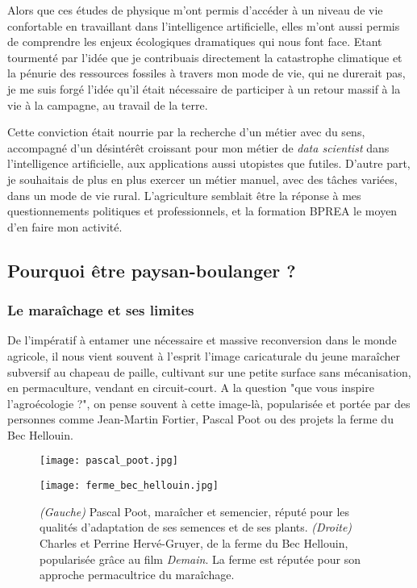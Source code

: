 \documentclass{book}
\begin{document}
Alors que ces études de physique m'ont permis d'accéder à un niveau de vie confortable en travaillant dans l'intelligence artificielle, elles m'ont aussi permis de comprendre les enjeux écologiques dramatiques qui nous font face. Etant tourmenté par l'idée que je contribuais directement la catastrophe climatique et la pénurie des ressources fossiles à travers mon mode de vie, qui ne durerait pas, je me suis forgé l'idée qu'il était nécessaire de participer à un retour massif à la vie à la campagne, au travail de la terre. 

Cette conviction était nourrie par la recherche d'un métier avec du sens, accompagné d'un désintérêt croissant pour mon métier de \textit{data scientist} dans l'intelligence artificielle, aux applications aussi utopistes que futiles. D'autre part, je souhaitais de plus en plus exercer un métier manuel, avec des tâches variées, dans un mode de vie rural. L'agriculture semblait être la réponse à mes questionnements politiques et professionnels, et la formation BPREA le moyen d'en faire mon activité.

\subsection{Pourquoi être paysan-boulanger ?}

\subsubsection{Le maraîchage et ses limites}

De l'impératif à entamer une nécessaire et massive reconversion dans le monde agricole, il nous vient souvent à l'esprit l'image caricaturale du jeune maraîcher subversif au chapeau de paille, cultivant sur une petite surface sans mécanisation, en permaculture, vendant en circuit-court. A la question "que vous inspire l'agroécologie ?", on pense souvent à cette image-là, popularisée et portée par des personnes comme Jean-Martin Fortier, Pascal Poot ou des projets la ferme du Bec Hellouin. 

\begin{figure}[h!]
\centering
\begin{minipage}{.5\textwidth}
  \centering
  \texttt{[image: pascal\_poot.jpg]}
  \label{fig:test1}
\end{minipage}%
\begin{minipage}{.5\textwidth}
  \centering
  \texttt{[image: ferme\_bec\_hellouin.jpg]}
  \label{fig:test2}
\end{minipage}
\caption{\textit{(Gauche)} Pascal Poot, maraîcher et semencier, réputé pour les qualités d'adaptation de ses semences et de ses plants. \textit{(Droite)} Charles et Perrine Hervé-Gruyer, de la ferme du Bec Hellouin, popularisée grâce au film \textit{Demain}. La ferme est réputée pour son approche permacultrice du maraîchage.}
\label{fig:test}
\end{figure}
\end{document}
